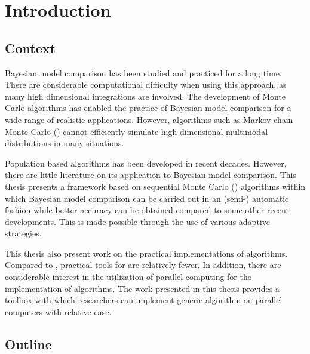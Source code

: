 \chapter{Introduction}
\label{cha:Introduction}

\section{Context}
\label{sec:Context}

Bayesian model comparison has been studied and practiced for a long time.
There are considerable computational difficulty when using this approach, as
many high dimensional integrations are involved. The development of Monte
Carlo algorithms has enabled the practice of Bayesian model comparison for a
wide range of realistic applications. However, algorithms such as Markov chain
Monte Carlo (\mcmc) cannot efficiently simulate high dimensional multimodal
distributions in many situations.

Population based algorithms has been developed in recent decades. However,
there are little literature on its application to Bayesian model comparison.
This thesis presents a framework based on sequential Monte Carlo (\smc)
algorithms within which Bayesian model comparison can be carried out in an
(semi-) automatic fashion while better accuracy can be obtained compared to
some other recent developments. This is made possible through the use of
various adaptive strategies.

This thesis also present work on the practical implementations of \smc
algorithms. Compared to \mcmc, practical tools for \smc are relatively fewer.
In addition, there are considerable interest in the utilization of parallel
computing for the implementation of \smc algorithms. The work presented in
this thesis provides a toolbox with which researchers can implement generic
\smc algorithm on parallel computers with relative ease.

\section{Outline}
\label{sec:Outline}

